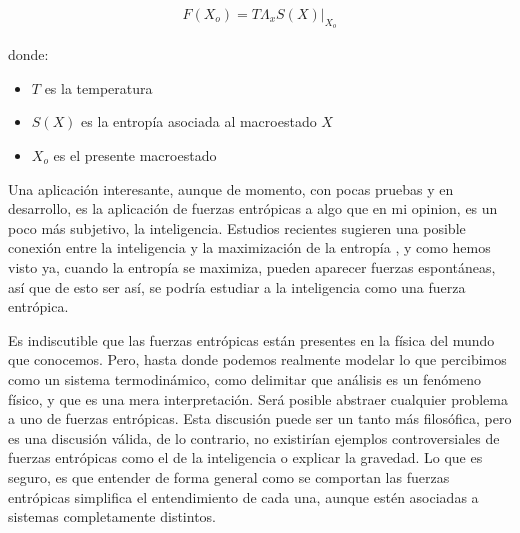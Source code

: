 \documentclass[11pt]{article}
\theoremstyle{Tema} \newtheorem{Tema}{Tema} %
\theoremstyle{Tema} \newtheorem{Serie}{Serie}              %
\theoremstyle{Tema} \newtheorem{Ejercicio}{Ejercicio}    %
\begin{document}
\begin{align}
	F(X_o)=T\Lambda_xS(X)\lvert_{X_o}
\end{align}

donde:

\begin{itemize}
	\item $T$ es la temperatura
	\item $S(X)$ es la entropía asociada al macroestado $X$
	\item $X_o$ es el presente macroestado
\end{itemize}

\hfill\cite{WikiEntropy}

\bigskip

Una aplicación interesante, aunque de momento, con pocas pruebas y en desarrollo, es la aplicación de fuerzas entrópicas a algo que en mi opinion, es un poco más subjetivo, la inteligencia. Estudios recientes sugieren una posible conexión entre la inteligencia y la maximización de la entropía \cite{PhysRevLett}, y como hemos visto ya, cuando la entropía se maximiza, pueden aparecer fuerzas espontáneas, así que de esto ser así, se podría estudiar a la inteligencia como una fuerza entrópica.

\bigskip

Es indiscutible que las fuerzas entrópicas están presentes en la física del mundo que conocemos. Pero, hasta donde podemos realmente modelar lo que percibimos como un sistema termodinámico, como delimitar que análisis es un fenómeno físico, y que es una mera interpretación. Será posible abstraer cualquier problema a uno de fuerzas entrópicas. Esta discusión puede ser un tanto más filosófica, pero es una discusión válida, de lo contrario, no existirían ejemplos controversiales de fuerzas entrópicas como el de la inteligencia o explicar la gravedad. 
Lo que es seguro, es que entender de forma general como se comportan las fuerzas entrópicas simplifica el entendimiento de cada una, aunque estén asociadas a sistemas completamente distintos.


\end{document}
